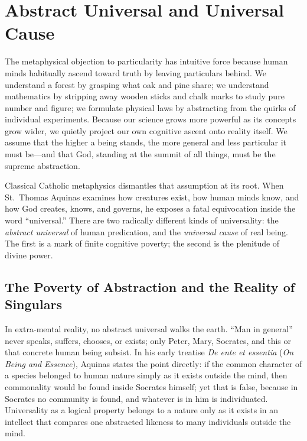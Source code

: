 \section{Abstract Universal and Universal Cause}

The metaphysical objection to particularity has intuitive force because human minds habitually ascend toward truth by leaving particulars behind. We understand a forest by grasping what oak and pine share; we understand mathematics by stripping away wooden sticks and chalk marks to study pure number and figure; we formulate physical laws by abstracting from the quirks of individual experiments. Because our science grows more powerful as its concepts grow wider, we quietly project our own cognitive ascent onto reality itself. We assume that the higher a being stands, the more general and less particular it must be---and that God, standing at the summit of all things, must be the supreme abstraction.

Classical Catholic metaphysics dismantles that assumption at its root. When St.\ Thomas Aquinas examines how creatures exist, how human minds know, and how God creates, knows, and governs, he exposes a fatal equivocation inside the word ``universal.'' There are two radically different kinds of universality: the \textit{abstract universal} of human predication, and the \textit{universal cause} of real being. The first is a mark of finite cognitive poverty; the second is the plenitude of divine power.

\subsection{The Poverty of Abstraction and the Reality of Singulars}

In extra-mental reality, no abstract universal walks the earth. ``Man in general'' never speaks, suffers, chooses, or exists; only Peter, Mary, Socrates, and this or that concrete human being subsist. In his early treatise \textit{De ente et essentia} (\textit{On Being and Essence}), Aquinas states the point directly: if the common character of a species belonged to human nature simply as it exists outside the mind, then commonality would be found inside Socrates himself; yet that is false, because in Socrates no community is found, and whatever is in him is individuated. Universality as a logical property belongs to a nature only as it exists in an intellect that compares one abstracted likeness to many individuals outside the mind.

